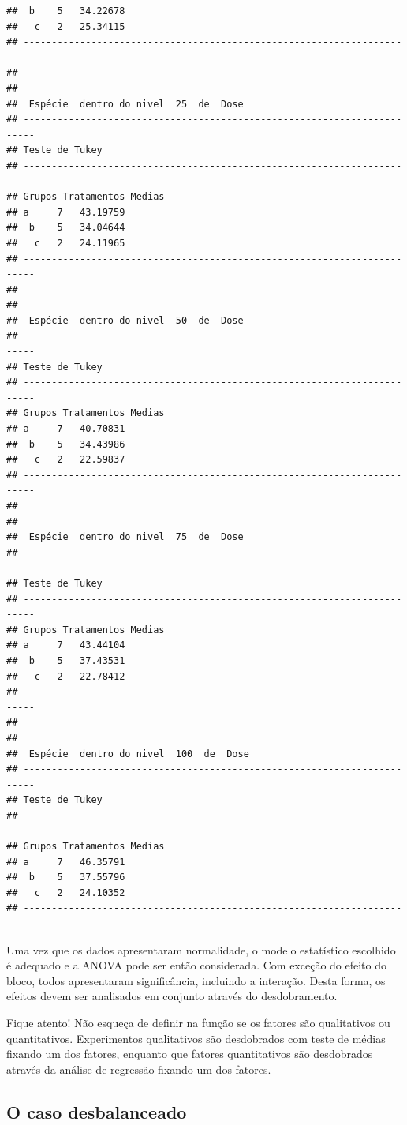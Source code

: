 \documentclass[
]{article}
\begin{document}
\begin{verbatim}
##  b    5   34.22678 
##   c   2   25.34115 
## ------------------------------------------------------------------------
## 
## 
##  Espécie  dentro do nivel  25  de  Dose 
## ------------------------------------------------------------------------
## Teste de Tukey
## ------------------------------------------------------------------------
## Grupos Tratamentos Medias
## a     7   43.19759 
##  b    5   34.04644 
##   c   2   24.11965 
## ------------------------------------------------------------------------
## 
## 
##  Espécie  dentro do nivel  50  de  Dose 
## ------------------------------------------------------------------------
## Teste de Tukey
## ------------------------------------------------------------------------
## Grupos Tratamentos Medias
## a     7   40.70831 
##  b    5   34.43986 
##   c   2   22.59837 
## ------------------------------------------------------------------------
## 
## 
##  Espécie  dentro do nivel  75  de  Dose 
## ------------------------------------------------------------------------
## Teste de Tukey
## ------------------------------------------------------------------------
## Grupos Tratamentos Medias
## a     7   43.44104 
##  b    5   37.43531 
##   c   2   22.78412 
## ------------------------------------------------------------------------
## 
## 
##  Espécie  dentro do nivel  100  de  Dose 
## ------------------------------------------------------------------------
## Teste de Tukey
## ------------------------------------------------------------------------
## Grupos Tratamentos Medias
## a     7   46.35791 
##  b    5   37.55796 
##   c   2   24.10352 
## ------------------------------------------------------------------------
\end{verbatim}

Uma vez que os dados apresentaram normalidade, o modelo estatístico escolhido é adequado e a ANOVA pode ser então considerada. Com exceção do efeito do bloco, todos apresentaram significância, incluindo a interação. Desta forma, os efeitos devem ser analisados em conjunto através do desdobramento.

Fique atento! Não esqueça de definir na função se os fatores são qualitativos ou quantitativos. Experimentos qualitativos são desdobrados com teste de médias fixando um dos fatores, enquanto que fatores quantitativos são desdobrados através da análise de regressão fixando um dos fatores.

\hypertarget{o-caso-desbalanceado-3}{%
\subsection{O caso desbalanceado}\label{o-caso-desbalanceado-3}}
\end{document}
